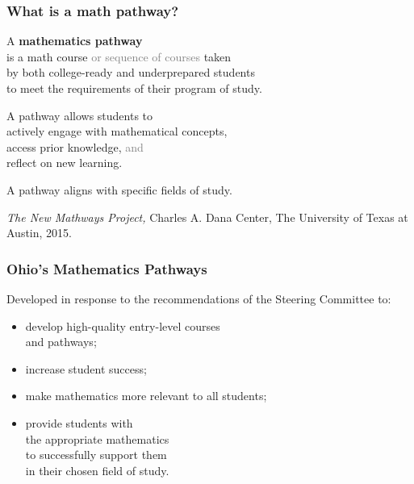 \documentclass[14pt]{beamer}
\newcounter{a}
\newcounter{b}
\begin{document}
\begin{frame}
  \frametitle{What is a math pathway?}

  A \textbf{mathematics pathway} \\
  \quad is a math course \textcolor{gray}{or sequence of courses} taken \\
  \quad by both college-ready and underprepared students \\
  \quad to meet the requirements of their program of study.

  \vfill

  A pathway allows students to \\
  \quad actively engage with mathematical concepts, \\
  \quad access prior knowledge, \textcolor{gray}{and} \\
  \quad reflect on new learning.

  \vfill

  A pathway aligns with specific fields of study.

  \vfill

\scriptsize\vfill\textcolor{dark}{\textit{The New Mathways Project,} Charles A. Dana Center, The University of Texas at Austin, 2015.}
\end{frame}

\begin{frame}
  \frametitle{Ohio's Mathematics Pathways}

  Developed in response to the recommendations of the Steering Committee to:
  \begin{itemize}
  \item develop high-quality entry-level courses \\
    \quad and pathways;
  \item increase student success;
  \item make mathematics more relevant to all students;
  \item provide students with \\
    \quad the appropriate mathematics \\
    \quad to successfully support them \\
    \quad in their chosen field of study.
  \end{itemize}
  
\end{frame}
\end{document}

